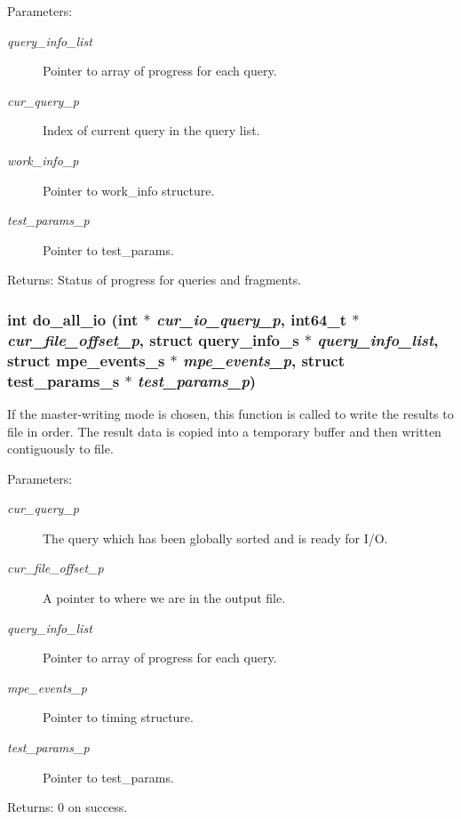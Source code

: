 \begin{Desc}
\item[Parameters:]
\begin{description}
\item[{\em query\_\-info\_\-list}]Pointer to array of progress for each query. \item[{\em cur\_\-query\_\-p}]Index of current query in the query list. \item[{\em work\_\-info\_\-p}]Pointer to work\_\-info structure. \item[{\em test\_\-params\_\-p}]Pointer to test\_\-params. \end{description}
\end{Desc}
\begin{Desc}
\item[Returns:]Status of progress for queries and fragments. \end{Desc}
\subsubsection{\setlength{\rightskip}{0pt plus 5cm}int do\_\-all\_\-io (int $\ast$ {\em cur\_\-io\_\-query\_\-p}, int64\_\-t $\ast$ {\em cur\_\-file\_\-offset\_\-p}, struct \bf{query\_\-info\_\-s} $\ast$ {\em query\_\-info\_\-list}, struct \bf{mpe\_\-events\_\-s} $\ast$ {\em mpe\_\-events\_\-p}, struct \bf{test\_\-params\_\-s} $\ast$ {\em test\_\-params\_\-p})}\label{master__help_8c_6153ffcafb3a84ad93ec8646bdecb7f3}


If the master-writing mode is chosen, this function is called to write the results to file in order. The result data is copied into a temporary buffer and then written contiguously to file.

\begin{Desc}
\item[Parameters:]
\begin{description}
\item[{\em cur\_\-query\_\-p}]The query which has been globally sorted and is ready for I/O. \item[{\em cur\_\-file\_\-offset\_\-p}]A pointer to where we are in the output file. \item[{\em query\_\-info\_\-list}]Pointer to array of progress for each query. \item[{\em mpe\_\-events\_\-p}]Pointer to timing structure. \item[{\em test\_\-params\_\-p}]Pointer to test\_\-params. \end{description}
\end{Desc}
\begin{Desc}
\item[Returns:]0 on success. \end{Desc}
